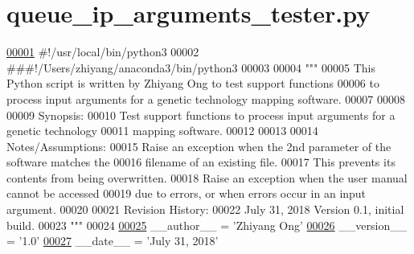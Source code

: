 \hypertarget{queue__ip__arguments__tester_8py_source}{}\section{queue\+\_\+ip\+\_\+arguments\+\_\+tester.\+py}
\label{queue__ip__arguments__tester_8py_source}

\begin{DoxyCode}
\hypertarget{queue__ip__arguments__tester_8py_source_l00001}{}\hyperlink{namespaceutilities_1_1queue__ip__arguments__tester}{00001} \textcolor{comment}{#!/usr/local/bin/python3}
00002 \textcolor{comment}{###!/Users/zhiyang/anaconda3/bin/python3}
00003 
00004 \textcolor{stringliteral}{"""}
00005 \textcolor{stringliteral}{    This Python script is written by Zhiyang Ong to test support functions}
00006 \textcolor{stringliteral}{        to process input arguments for a genetic technology mapping software.}
00007 \textcolor{stringliteral}{}
00008 \textcolor{stringliteral}{}
00009 \textcolor{stringliteral}{    Synopsis:}
00010 \textcolor{stringliteral}{    Test support functions to process input arguments for a genetic technology}
00011 \textcolor{stringliteral}{        mapping software.}
00012 \textcolor{stringliteral}{}
00013 \textcolor{stringliteral}{}
00014 \textcolor{stringliteral}{    Notes/Assumptions:}
00015 \textcolor{stringliteral}{    Raise an exception when the 2nd parameter of the software matches the}
00016 \textcolor{stringliteral}{        filename of an existing file.}
00017 \textcolor{stringliteral}{        This prevents its contents from being overwritten.}
00018 \textcolor{stringliteral}{    Raise an exception when the user manual cannot be accessed}
00019 \textcolor{stringliteral}{        due to errors, or when errors occur in an input argument.}
00020 \textcolor{stringliteral}{}
00021 \textcolor{stringliteral}{    Revision History:}
00022 \textcolor{stringliteral}{    July 31, 2018           Version 0.1, initial build.}
00023 \textcolor{stringliteral}{"""}
00024 
\hypertarget{queue__ip__arguments__tester_8py_source_l00025}{}\hyperlink{namespaceutilities_1_1queue__ip__arguments__tester_a4613e6fdf0e66646ab9e6b2431f60697}{00025} \_\_author\_\_ = \textcolor{stringliteral}{'Zhiyang Ong'}
\hypertarget{queue__ip__arguments__tester_8py_source_l00026}{}\hyperlink{namespaceutilities_1_1queue__ip__arguments__tester_a37d1fc5c2ed863dec0b8ce969bc4ac4c}{00026} \_\_version\_\_ = \textcolor{stringliteral}{'1.0'}
\hypertarget{queue__ip__arguments__tester_8py_source_l00027}{}\hyperlink{namespaceutilities_1_1queue__ip__arguments__tester_abb3d4e36e816d047434e26922c0e28fe}{00027} \_\_date\_\_ = \textcolor{stringliteral}{'July 31, 2018'}

\end{DoxyCode}
